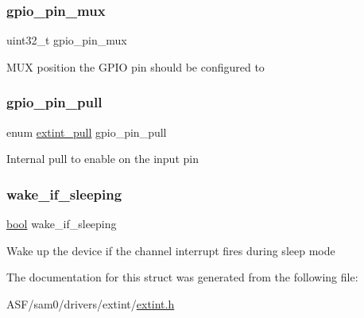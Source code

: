 \subsubsection{\texorpdfstring{gpio\_pin\_mux}{gpio\_pin\_mux}}
{\footnotesize\ttfamily uint32\+\_\+t gpio\+\_\+pin\+\_\+mux}

M\+UX position the G\+P\+IO pin should be configured to \mbox{\label{structextint__chan__conf_a2722ba2735f217f3c7e30f2e4135c134}} 
\subsubsection{\texorpdfstring{gpio\_pin\_pull}{gpio\_pin\_pull}}
{\footnotesize\ttfamily enum \mbox{\hyperlink{group__asfdoc__sam0__extint__group_ga01b49a5a87ca71359c5a9bc2ee02853e}{extint\+\_\+pull}} gpio\+\_\+pin\+\_\+pull}

Internal pull to enable on the input pin \mbox{\label{structextint__chan__conf_a5b60cacd31d57bf5bafafcdf22594ac7}} 
\subsubsection{\texorpdfstring{wake\_if\_sleeping}{wake\_if\_sleeping}}
{\footnotesize\ttfamily \mbox{\hyperlink{group__group__sam0__utils_ga97a80ca1602ebf2303258971a2c938e2}{bool}} wake\+\_\+if\+\_\+sleeping}

Wake up the device if the channel interrupt fires during sleep mode 

The documentation for this struct was generated from the following file\+:\begin{DoxyCompactItemize}
\item 
A\+S\+F/sam0/drivers/extint/\mbox{\hyperlink{extint_8h}{extint.\+h}}\end{DoxyCompactItemize}
